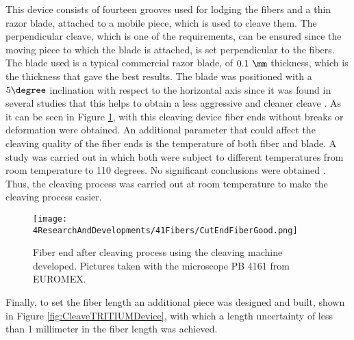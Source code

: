 This device consists of fourteen grooves used for lodging the fibers and a thin razor blade, attached to a mobile piece, which is used to cleave them. The perpendicular cleave, which is one of the requirements, can be ensured since the moving piece to which the blade is attached, is set perpendicular to the fibers. The blade used is a typical commercial razor blade, of $0.1~\mm$ thickness, which is the thickness that gave the best results. The blade was positioned with a $5\degree$ inclination with respect to the horizontal axis since it was found in several studies that this helps to obtain a less aggressive and cleaner cleave \cite{AngleBlade, TemperatureBlade}. As it can be seen in Figure \ref{fig:CleavingFiberEnd}, with this cleaving device fiber ends without breaks or deformation were obtained. An additional parameter that could affect the cleaving quality of the fiber ends is the temperature of both fiber and blade. A study was carried out in which both were subject to different temperatures from room temperature to 110 degrees. No significant conclusions were obtained \cite{TFGAlberto}. Thus, the cleaving process was carried out at room temperature to make the cleaving process easier.

\begin{figure}[h]
\centering
\texttt{[image: 4ResearchAndDevelopments/41Fibers/CutEndFiberGood.png]}
\caption{Fiber end after cleaving process using the cleaving machine developed. Pictures taken with the microscope PB 4161 from EUROMEX.\label{fig:CleavingFiberEnd}}
\end{figure}

Finally, to set the fiber length an additional piece was designed and built, shown in Figure \ref{fig:CleaveTRITIUMDevice}, with which a length uncertainty of less than 1 millimeter in the fiber length was achieved.